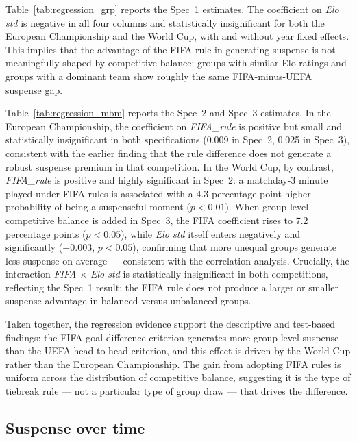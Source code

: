 \documentclass[11pt]{article}
\begin{document}


Table~\ref{tab:regression_grp} reports the Spec~1 estimates. The coefficient on \textit{Elo std} is negative in all four columns and statistically insignificant for both the European Championship and the World Cup, with and without year fixed effects. This implies that the advantage of the FIFA rule in generating suspense is not meaningfully shaped by competitive balance: groups with similar Elo ratings and groups with a dominant team show roughly the same FIFA-minus-UEFA suspense gap.



Table~\ref{tab:regression_mbm} reports the Spec~2 and Spec~3 estimates. In the European Championship, the coefficient on \textit{FIFA\_rule} is positive but small and statistically insignificant in both specifications (0.009 in Spec~2, 0.025 in Spec~3), consistent with the earlier finding that the rule difference does not generate a robust suspense premium in that competition. In the World Cup, by contrast, \textit{FIFA\_rule} is positive and highly significant in Spec~2: a matchday-3 minute played under FIFA rules is associated with a 4.3 percentage point higher probability of being a suspenseful moment ($p<0.01$). When group-level competitive balance is added in Spec~3, the FIFA coefficient rises to 7.2 percentage points ($p<0.05$), while \textit{Elo std} itself enters negatively and significantly ($-$0.003, $p<0.05$), confirming that more unequal groups generate less suspense on average — consistent with the correlation analysis. Crucially, the interaction \textit{FIFA $\times$ Elo std} is statistically insignificant in both competitions, reflecting the Spec~1 result: the FIFA rule does not produce a larger or smaller suspense advantage in balanced versus unbalanced groups.

Taken together, the regression evidence support the descriptive and test-based findings: the FIFA goal-difference criterion generates more group-level suspense than the UEFA head-to-head criterion, and this effect is driven by the World Cup rather than the European Championship. The gain from adopting FIFA rules is uniform across the distribution of competitive balance, suggesting it is the type of tiebreak rule — not a particular type of group draw — that drives the difference.


\subsection{Suspense over time}
\end{document}
